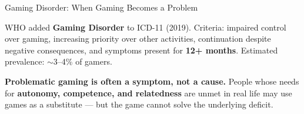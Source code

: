 \documentclass[aspectratio=169,11pt]{beamer}
\begin{document}
\begin{frame}[t]{Gaming Disorder: When Gaming Becomes a Problem}
\begin{conceptbox}
\footnotesize
WHO added \textbf{Gaming Disorder} to ICD-11 (2019). Criteria: impaired control over gaming, increasing priority over other activities, continuation despite negative consequences, and symptoms present for \textbf{12+ months}. Estimated prevalence: $\sim$3--4\% of gamers.
\end{conceptbox}

\vspace{0.15cm}
\begin{conceptbox}
\footnotesize
\textbf{Problematic gaming is often a symptom, not a cause.} People whose needs for \textbf{autonomy, competence, and relatedness} are unmet in real life may use games as a substitute --- but the game cannot solve the underlying deficit.
\end{conceptbox}
\end{frame}
\end{document}
